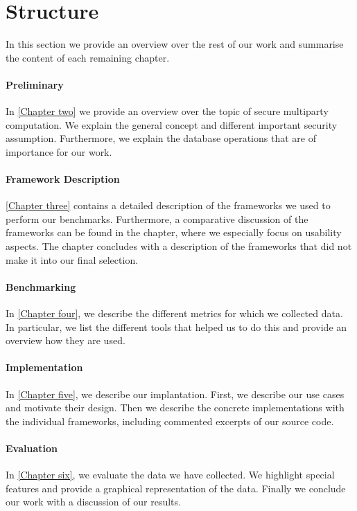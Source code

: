 \section{Structure}
In this section we provide an overview over the rest of our work and summarise the content of each remaining chapter.
\paragraph{Preliminary}

In \hyperref[Preliminary]{[Chapter two]} we provide an overview over the topic of secure multiparty computation. We explain the general concept and different important security assumption. Furthermore, we explain the database operations that are of importance for our work. 
\paragraph{Framework Description}
\hyperref[Framework Desciption]{[Chapter three]} contains a detailed description of the frameworks we used to perform our benchmarks. Furthermore, a comparative discussion of the frameworks can be found in the chapter, where we especially focus on usability aspects. The chapter concludes with a description of the frameworks that did not make it into our final selection. 
\paragraph{Benchmarking}
In \hyperref[Benchmarking]{[Chapter four]}, we describe the different metrics for which we collected data. In particular, we list the different tools that helped us to do this and provide an overview how they are used. 
\paragraph{Implementation}
In \hyperref[Implementation]{[Chapter five]}, we describe our implantation. First, we describe our use cases and motivate their design.  Then we describe the concrete implementations with the individual frameworks, including commented excerpts of our source code.
\paragraph{Evaluation}
In \hyperref[Evaluation]{[Chapter six]}, we evaluate the data we have collected. We highlight special features and provide a graphical representation of the data. 
Finally we conclude our work with a discussion of our results.
